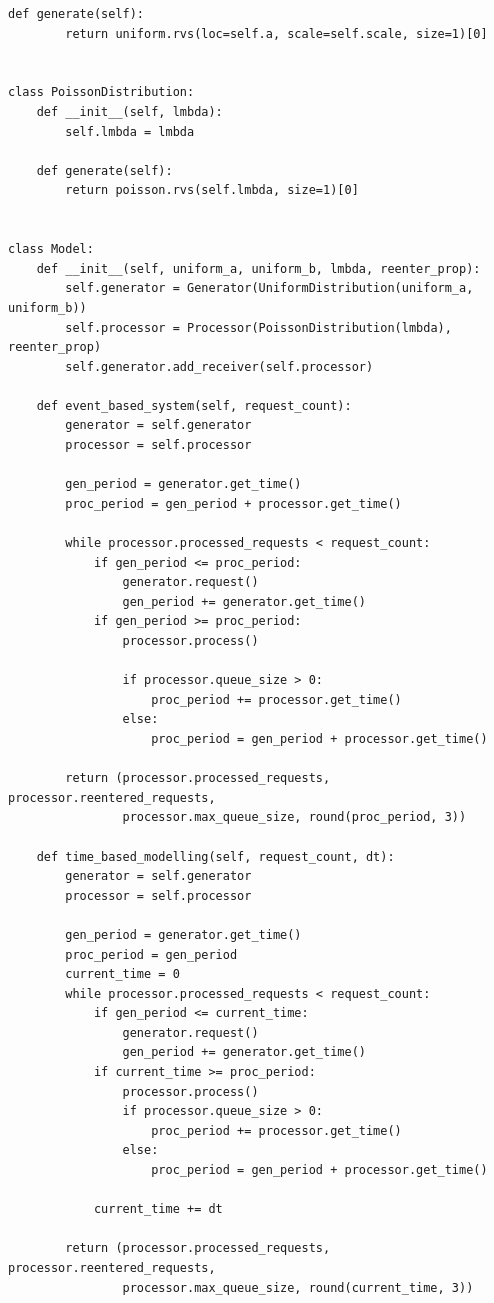 \documentclass[14pt, a4paper]{extarticle}
\begin{document}
\begin{lstlisting}[label=lst:list1]
    def generate(self):
        return uniform.rvs(loc=self.a, scale=self.scale, size=1)[0]


class PoissonDistribution:
    def __init__(self, lmbda):
        self.lmbda = lmbda

    def generate(self):
        return poisson.rvs(self.lmbda, size=1)[0]


class Model:
    def __init__(self, uniform_a, uniform_b, lmbda, reenter_prop):
        self.generator = Generator(UniformDistribution(uniform_a, uniform_b))
        self.processor = Processor(PoissonDistribution(lmbda), reenter_prop)
        self.generator.add_receiver(self.processor)

    def event_based_system(self, request_count):
        generator = self.generator
        processor = self.processor

        gen_period = generator.get_time()
        proc_period = gen_period + processor.get_time()

        while processor.processed_requests < request_count:
            if gen_period <= proc_period:
                generator.request()
                gen_period += generator.get_time()
            if gen_period >= proc_period:
                processor.process()

                if processor.queue_size > 0:
                    proc_period += processor.get_time()
                else:
                    proc_period = gen_period + processor.get_time()

        return (processor.processed_requests, processor.reentered_requests,
                processor.max_queue_size, round(proc_period, 3))

    def time_based_modelling(self, request_count, dt):
        generator = self.generator
        processor = self.processor

        gen_period = generator.get_time()
        proc_period = gen_period
        current_time = 0
        while processor.processed_requests < request_count:
            if gen_period <= current_time:
                generator.request()
                gen_period += generator.get_time()
            if current_time >= proc_period:
                processor.process()
                if processor.queue_size > 0:
                    proc_period += processor.get_time()
                else:
                    proc_period = gen_period + processor.get_time()

            current_time += dt

        return (processor.processed_requests, processor.reentered_requests,
                processor.max_queue_size, round(current_time, 3))


\end{lstlisting}
\end{document}

